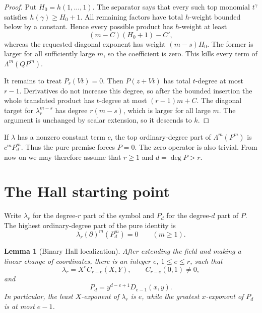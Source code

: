 \documentclass[11pt]{article}
\newtheorem{lemma}[theorem]{Lemma}
\begin{document}
\begin{proof}
Put $H_0=h(1,\ldots,1)$.  The separator says that every such top monomial
$t^\gamma$ satisfies $h(\gamma)\geq H_0+1$.  All remaining factors have
total $h$-weight bounded below by a constant.  Hence every possible product
has $h$-weight at least
\[
 (m-C)(H_0+1)-C',
\]
whereas the requested diagonal exponent has weight $(m-s)H_0$.  The former
is larger for all sufficiently large $m$, so the coefficient is zero.  This
kills every term of $\Lambda^m(QP^m)$.

It remains to treat $P_r(Vt)=0$.  Then $P(z+Vt)$ has total $t$-degree at
most $r-1$.
Derivatives do not increase this degree, so after the bounded insertion the
whole translated product has $t$-degree at most $(r-1)m+C$.  The diagonal
target for $\lambda_r^{m-s}$ has degree $r(m-s)$, which is larger for all
large $m$.  The argument is unchanged by scalar extension, so it descends
to $k$.
\end{proof}

If $\lambda$ has a nonzero constant term $c$, the top ordinary-degree part
of $\Lambda^m(P^m)$ is $c^mP_d^m$.  Thus the pure premise forces $P=0$.
The zero operator is also trivial.  From now on we may therefore assume
that $r\geq1$ and $d=\deg P>r$.

\section{The Hall starting point}

Write $\lambda_r$ for the degree-$r$ part of the symbol and $P_d$ for the
degree-$d$ part of $P$.  The highest ordinary-degree part of the pure
identity is
\begin{equation}\label{eq:top-pure}
 \lambda_r(\partial)^m(P_d^m)=0\qquad(m\geq1).
\end{equation}

\begin{lemma}[Binary Hall localization]\label{lem:hall}
After extending the field and making a linear change of coordinates, there
is an integer $e$, $1\leq e\leq r$, such that
\begin{equation}\label{eq:hall-normal}
 \lambda_r=X^eC_{r-e}(X,Y),\qquad C_{r-e}(0,1)\ne0,
\end{equation}
and
\begin{equation}\label{eq:hall-poly}
 P_d=y^{d-e+1}D_{e-1}(x,y).
\end{equation}
In particular, the least $X$-exponent of $\lambda_r$ is $e$, while the
greatest $x$-exponent of $P_d$ is at most $e-1$.
\end{lemma}
\end{document}
